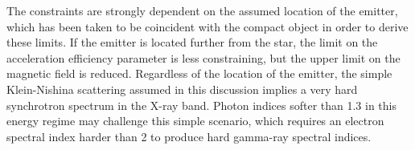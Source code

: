 \documentclass[preprint2]{aastex}
\newcommand{\tev}{\,TeV}
\begin{document}
The constraints are strongly dependent on the assumed location of the emitter, which has been taken to be coincident with the compact object in order to derive these limits. If the emitter is located further from the star, the limit on the acceleration efficiency parameter is less constraining, but the upper limit on the magnetic field is reduced. Regardless of the location of the emitter, the simple Klein-Nishina scattering assumed in this discussion implies a very hard synchrotron spectrum in the X-ray band. Photon indices softer than 1.3 in this energy regime \citep{pkaricrc} may challenge this simple scenario, which requires an electron spectral index harder than 2 to produce hard gamma-ray spectral indices.


\end{document}
